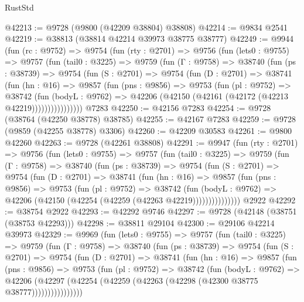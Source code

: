 \begin{lexlean}{RustStd}
\begin{coremodule}
@42213 := @9728 (@9800 (@42209 @38804) @38808)
@42214 := @9834 @2541
@42219 := @38813 (@38814 @42214 @39973 @38775 @38777)
@42249 := @9944
    (fun (rc : @9752) =>
    @9754
      (fun (rty : @2701) =>
      @9756
        (fun (lets0 : @9755) =>
        @9757
          (fun (tail0 : @3225) =>
          @9759
            (fun (Γ : @9758) =>
            @38740
              (fun (ps : @38739) =>
              @9754
                (fun (S : @2701) =>
                @9754
                  (fun (D : @2701) =>
                  @38741
                    (fun (hn : @16) =>
                    @9857
                      (fun (pns : @9856) =>
                      @9753
                        (fun (pl : @9752) =>
                        @38742
                          (fun (bodyL : @9762) =>
                          @42206 (@42150 (@42161 (@42172 (@42213 @42219))))))))))))))))
    @7283
@42250 := @42156 @7283
@42254 := @9728 (@38764 (@42250 @38778) @38785)
@42255 := @42167 @7283
@42259 := @9728 (@9859 (@42255 @38778) @3306)
@42260 := @42209 @30583
@42261 := @9800 @42260
@42263 := @9728 (@42261 @38808)
@42291 := @9947
    (fun (rty : @2701) =>
    @9756
      (fun (lets0 : @9755) =>
      @9757
        (fun (tail0 : @3225) =>
        @9759
          (fun (Γ : @9758) =>
          @38740
            (fun (ps : @38739) =>
            @9754
              (fun (S : @2701) =>
              @9754
                (fun (D : @2701) =>
                @38741
                  (fun (hn : @16) =>
                  @9857
                    (fun (pns : @9856) =>
                    @9753
                      (fun (pl : @9752) =>
                      @38742
                        (fun (bodyL : @9762) =>
                        @42206 (@42150 (@42254 (@42259 (@42263 @42219)))))))))))))))
    @2922
@42292 := @38754 @2922
@42293 := @42292 @9746
@42297 := @9728 (@42148 (@38751 (@38753 @42293)))
@42298 := @38811 @29104
@42300 := @29106 @42214 @39973
@42329 := @9969
    (fun (lets0 : @9755) =>
    @9757
      (fun (tail0 : @3225) =>
      @9759
        (fun (Γ : @9758) =>
        @38740
          (fun (ps : @38739) =>
          @9754
            (fun (S : @2701) =>
            @9754
              (fun (D : @2701) =>
              @38741
                (fun (hn : @16) =>
                @9857
                  (fun (pns : @9856) =>
                  @9753
                    (fun (pl : @9752) =>
                    @38742
                      (fun (bodyL : @9762) =>
                      @42206
                        (@42297
                          (@42254 (@42259 (@42263 (@42298 (@42300 @38775 @38777))))))))))))))))

\end{coremodule}
\end{lexlean}
